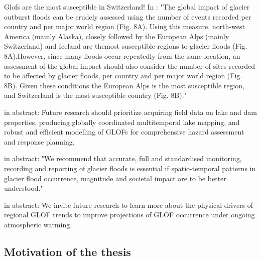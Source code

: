 Glofs are the most susceptible in Switzerland!
In \cite{Carrivick&Tweed2016}: "The global impact of glacier outburst floods can be crudely assessed
using the number of events recorded per country and per major world
region (Fig. 8A). Using this measure, north-west America (mainly Alaska),
closely followed by the European Alps (mainly Switzerland) and
Iceland are themost susceptible regions to glacier floods (Fig. 8A).However,
since many floods occur repeatedly from the same location, an assessment
of the global impact should also consider the number of sites
recorded to be affected by glacier floods, per country and per major
world region (Fig. 8B). Given these conditions the European Alps is
the most susceptible region, and Switzerland is the most susceptible
country (Fig. 8B)."





\cite{Zhang&al2024} in abstract: Future research should prioritize acquiring field data on lake and dam properties, producing globally coordinated multitemporal lake mapping, and robust and efficient modelling of GLOFs for comprehensive hazard assessment and response planning.

\cite{Carrivick&Tweed2016} in abstract: "We recommend that accurate, full and standardised monitoring, recording and reporting of glacier floods is essential if spatio-temporal patterns in glacier flood occurrence, magnitude and societal impact are to be better understood."

\cite{Veh&al2022} in abstract: We invite future research to learn more about the physical drivers of regional GLOF trends to improve projections of GLOF occurrence under ongoing atmospheric warming.

\subsection{Motivation of the thesis}

